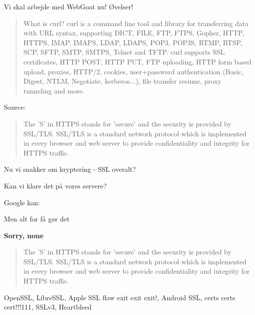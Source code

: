 \documentclass[20pt,landscape,a4paper,footrule]{foils}
\begin{document}

Vi skal arbejde med WebGoat nu! Øvelser!




\begin{quote}
	What is curl?
curl is a command line tool and library for transferring data with URL syntax, supporting DICT, FILE, FTP, FTPS, Gopher, HTTP, HTTPS, IMAP, IMAPS, LDAP, LDAPS, POP3, POP3S, RTMP, RTSP, SCP, SFTP, SMTP, SMTPS, Telnet and TFTP. curl supports SSL certificates, HTTP POST, HTTP PUT, FTP uploading, HTTP form based upload, proxies, HTTP/2, cookies, user+password authentication (Basic, Digest, NTLM, Negotiate, kerberos...), file transfer resume, proxy tunneling and more.
\end{quote}

Source: 



\begin{quote}
The 'S' in HTTPS stands for 'secure' and the security is provided by SSL/TLS. SSL/TLS is a standard network protocol which is implemented in every browser and web server to provide confidentiality and integrity for HTTPS traffic.
\end{quote}

\begin{list1}
\item Nu vi snakker om kryptering - SSL overalt?
\item Kan vi klare det på vores servere?
\pause
\item Google kan:\\
\item Men alt for få gør det
\end{list1}


{\bf \LARGE Sorry, none}

\begin{quote}
The 'S' in HTTPS stands for 'secure' and the security is provided by SSL/TLS. SSL/TLS is a standard network protocol which is implemented in every browser and web server to provide confidentiality and integrity for HTTPS traffic.
\end{quote}

OpenSSL, LibreSSL, Apple SSL flaw exit exit exit!, Android SSL, certs certs cert!!!111, SSLv3, Heartbleed
\end{document}
